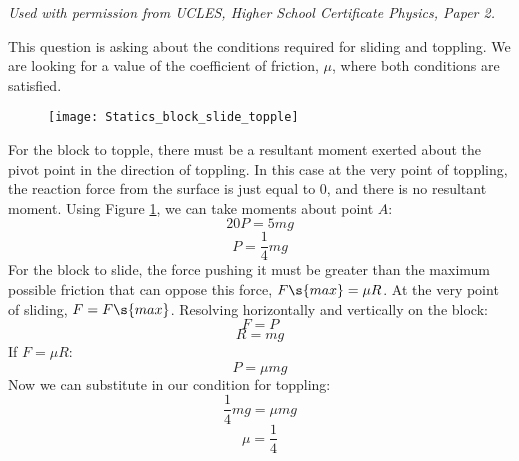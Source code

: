 
\begin{problem}
 {  }
{\textit{Used with permission from UCLES, Higher School Certificate Physics, Paper 2.}} %
{
This question is asking about the conditions required for sliding and toppling. We are looking for a value of the coefficient of friction, $\mu$, where both conditions are satisfied.

\begin{figure}
	\centering
	\texttt{[image: Statics\_block\_slide\_topple]}
	\caption{}
	\label{fig:Statics_block_slide_topple}
\end{figure}

\nl
For the block to topple, there must be a resultant moment exerted about the pivot point in the direction of toppling. In this case at the very point of toppling, the reaction force from the surface is just equal to 0, and there is no resultant moment. Using Figure \ref{fig:Statics_block_slide_topple}, we can take moments about point $A$:
\begin{equation*}	
20P = 5mg	
\end{equation*}
\begin{equation*}	
P = \frac{1}{4}mg 	
\end{equation*}
For the block to slide, the force pushing it must be greater than the maximum possible friction that can oppose this force, $F\s{max} = \mu R$. At the very point of sliding, $F = F\s{max}$. Resolving horizontally and vertically on the block:
\begin{equation*}	
F = P 	
\end{equation*}
\begin{equation*}	
R = mg	
\end{equation*}
If $F = \mu R$:
\begin{equation*}
 P = \mu mg	
 \end{equation*}
Now we can substitute in our condition for toppling:
\begin{equation*}	
\frac{1}{4}mg = \mu mg	
\end{equation*}
\begin{equation*}	
\mu = \frac{1}{4}	
\end{equation*}
}
\end{problem}